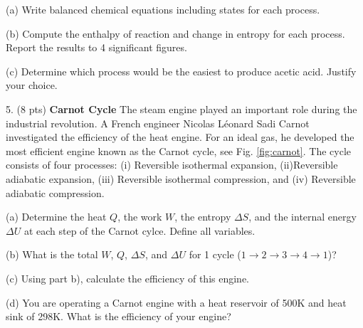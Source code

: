 \documentclass[11pt]{article}
\begin{document}
(a) Write balanced chemical equations including states for each process.

(b) Compute the enthalpy of reaction and change in entropy for each process. Report the results
to 4 significant figures.

(c) Determine which process would be the easiest to produce acetic acid. Justify your choice.

\pagebreak

%

5. (8 pts) \textbf{Carnot Cycle} The steam engine played an important role during the industrial
revolution. A French engineer Nicolas L\'{e}onard Sadi Carnot investigated the efficiency
of the heat engine. For an ideal gas, he developed the most efficient engine known as the Carnot cycle, see
Fig. \ref{fig:carnot}. The cycle consists of four processes: (i) Reversible isothermal expansion,
(ii)Reversible adiabatic expansion, (iii) Reversible isothermal compression, and (iv) Reversible
adiabatic compression.

(a) Determine the heat $Q$, the work $W$, the entropy $\Delta S$, and the internal energy $\Delta U$
at each step of the Carnot cylce. Define all variables.

(b) What is the total $W$, $Q$, $\Delta S$, and $\Delta U$ for 1 cycle ($1\rightarrow 2 \rightarrow 3
\rightarrow 4 \rightarrow 1$)?

(c) Using part b), calculate the efficiency of this engine.

(d) You are operating a Carnot engine with a heat reservoir of 500K and heat sink of
298K. What is the efficiency of your engine?
\end{document}
